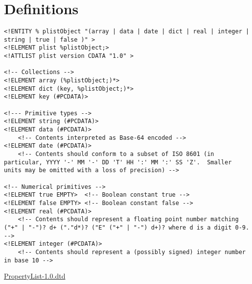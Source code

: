 
\chapter{Definitions}

\begin{table}[htdp]
\begin{center}
\begin{lstlisting}[mathescape]
<!ENTITY % plistObject "(array | data | date | dict | real | integer | string | true | false )" >
<!ELEMENT plist %plistObject;>
<!ATTLIST plist version CDATA "1.0" >

<!-- Collections -->
<!ELEMENT array (%plistObject;)*>
<!ELEMENT dict (key, %plistObject;)*>
<!ELEMENT key (#PCDATA)>

<!--- Primitive types -->
<!ELEMENT string (#PCDATA)>
<!ELEMENT data (#PCDATA)> 
    <!-- Contents interpreted as Base-64 encoded -->
<!ELEMENT date (#PCDATA)> 
    <!-- Contents should conform to a subset of ISO 8601 (in particular, YYYY '-' MM '-' DD 'T' HH ':' MM ':' SS 'Z'.  Smaller units may be omitted with a loss of precision) -->

<!-- Numerical primitives -->
<!ELEMENT true EMPTY>  <!-- Boolean constant true -->
<!ELEMENT false EMPTY> <!-- Boolean constant false -->
<!ELEMENT real (#PCDATA)> 
    <!-- Contents should represent a floating point number matching ("+" | "-")? d+ ("."d*)? ("E" ("+" | "-") d+)? where d is a digit 0-9.  -->
<!ELEMENT integer (#PCDATA)> 
    <!-- Contents should represent a (possibly signed) integer number in base 10 -->
\end{lstlisting}
\caption{\href{http://www.apple.com/DTDs/PropertyList-1.0.dtd}{PropertyList-1.0.dtd}}
\label{tab:PLISTDTD}
\end{center}

\end{table}%

